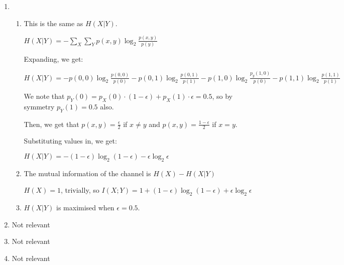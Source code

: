 


\begin{enumerate}[label=(\alph*)]

  \item
    \begin{enumerate}[label=(\roman*)]

      \item
        This is the same as $H(X|Y)$.

        $H(X|Y) = -\sum_X \sum_Y p(x,y) \log_2 \frac{p(x,y)}{p(y)}$

        Expanding, we get:

        $H(X|Y) = - p(0,0) \log_2 \frac{p(0,0)}{p(0)} - p(0, 1) \log_2 \frac{p(0,1)}{p(1)} - p(1,0) \log_2 \frac{p_y(1,0)}{p(0)} - p(1,1) \log_2 \frac{p(1,1)}{p(1)}$

        We note that $p_Y(0) = p_X(0) \cdot (1- \epsilon) + p_X(1) \cdot \epsilon = 0.5$, so by symmetry $p_Y(1) = 0.5$ also.

        Then, we get that $p(x,y) = \frac{\epsilon}{2}$ if $x \neq y$ and $p(x,y) = \frac{1-\epsilon}{2}$ if $x=y$.

        Substituting values in, we get:

        $H(X|Y) = -(1- \epsilon)\log_2 (1-\epsilon) - \epsilon \log_2 \epsilon$

      \item
        The mutual information of the channel is $H(X) - H(X|Y)$

        $H(X) = 1$, trivially, so $I(X;Y) =1 + (1-\epsilon)\log_2 (1-\epsilon) + \epsilon \log_2 \epsilon$

      \item
        $H(X|Y)$ is maximised when $\epsilon = 0.5$.
        
    \end{enumerate}

  \item
    Not relevant

  \item
    Not relevant

  \item
    Not relevant
        
    \end{enumerate}

